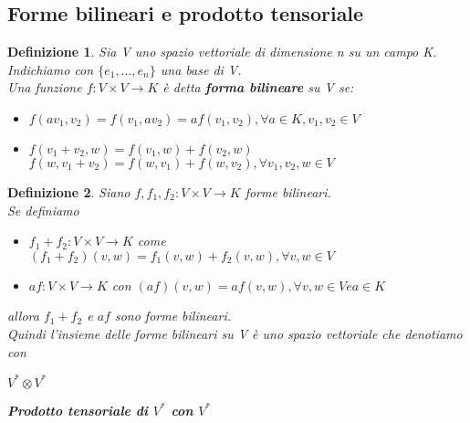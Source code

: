 \documentclass[a4paper,12pt]{article}
\theoremstyle{def}
\newtheorem*{definition}{Definizione}
\theoremstyle{prop}
\theoremstyle{esempio}
\theoremstyle{dimostrazione}
\theoremstyle{teo}
\theoremstyle{osservazione}
\begin{document}
\newpage

\subsection{Forme bilineari e prodotto tensoriale}
\begin{definition}
	Sia V uno spazio vettoriale  di dimensione n su un campo K.\\
	Indichiamo con \(\{e_1, ... , e_n\}\) una base di V.\\
	Una funzione \(f : V \times V \rightarrow K\) è detta \textbf{forma bilineare} su V se:
	\begin{itemize}
		\item \(f(a v_1, v_2) = f(v_1, a v_2) = a f(v_1,v_2), \forall a \in K, v_1, v_2 \in V\)
		\item \(f(v_1 + v_2, w) = f(v_1, w) + f(v_2, w)\)\\
		      \(f(w, v_1 + v_2) = f(w, v_1) + f(w, v_2), \forall v_1, v_2, w \in V\)
	\end{itemize}
\end{definition}

\begin{definition}
	Siano \(f, f_1, f_2 : V \times V \rightarrow K\) forme bilineari.\\
	Se definiamo
	\begin{itemize}
		\item \(f_1 + f_2 : V \times V \rightarrow K\) come \((f_1 + f_2)(v, w) = f_1(v, w) + f_2(v, w), \forall v,w \in V\)
		      \item\(a f : V \times V \rightarrow K\) con \((a f)(v, w) = a f(v, w), \forall v,w \in V e a \in K\)
	\end{itemize}
	allora \(f_1 + f_2\) e \(a f\) sono forme bilineari.\\
	Quindi l'insieme delle forme bilineari su V è uno spazio vettoriale che denotiamo con
	\begin{center}
		\(V^* \otimes V^*\)
	\end{center}
	\textbf{Prodotto tensoriale di \(V^*\) con \(V^*\)}
\end{definition}
\end{document}
